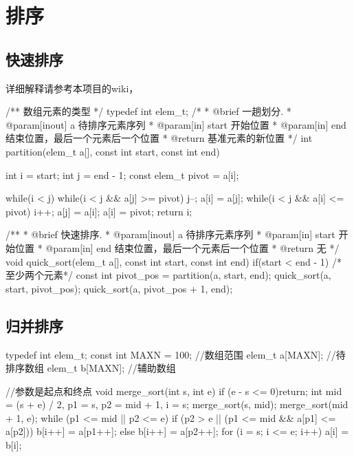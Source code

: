 \chapter{排序}

\section{快速排序} %
详细解释请参考本项目的wiki，

\begin{Codex}[label=quick_sort.c]
/** 数组元素的类型 */
typedef int elem_t;
 /*
  * @brief 一趟划分.
  * @param[inout] a 待排序元素序列
  * @param[in] start 开始位置
  * @param[in] end 结束位置，最后一个元素后一个位置
  * @return 基准元素的新位置
  */
int partition(elem_t a[], const int start, const int end) {
    int i = start;
    int j = end - 1;
    const elem_t pivot = a[i];

    while(i < j) {
        while(i < j && a[j] >= pivot) j--;
        a[i] = a[j];
        while(i < j && a[i] <= pivot) i++;
        a[j] = a[i];
    }
    a[i] = pivot;
    return i;
}

/**
  * @brief 快速排序.
  * @param[inout] a 待排序元素序列
  * @param[in] start 开始位置
  * @param[in] end 结束位置，最后一个元素后一个位置
  * @return 无
  */
void quick_sort(elem_t a[], const int start, const int end) {
    if(start < end - 1) { /* 至少两个元素*/
        const int pivot_pos = partition(a, start, end);
        quick_sort(a, start, pivot_pos);
        quick_sort(a, pivot_pos + 1, end);
    }
}
\end{Codex}

\section{归并排序} %

\begin{Codex}[label=merge_sort.c]
typedef int elem_t;
const int MAXN = 100; //数组范围
elem_t a[MAXN];       //待排序数组
elem_t b[MAXN];       //辅助数组

//参数是起点和终点
void merge_sort(int s, int e)
{
    if (e - s <= 0)return;
    int mid = (s + e) / 2, p1 = s, p2 = mid + 1, i = s;
    merge_sort(s, mid);
    merge_sort(mid + 1, e);
    while (p1 <= mid || p2 <= e)
    {
        if (p2 > e || (p1 <= mid && a[p1] <= a[p2]))
            b[i++] = a[p1++];
        else b[i++] = a[p2++];
    }
    for (i = s; i <= e; i++)
        a[i] = b[i];
}
\end{Codex}
